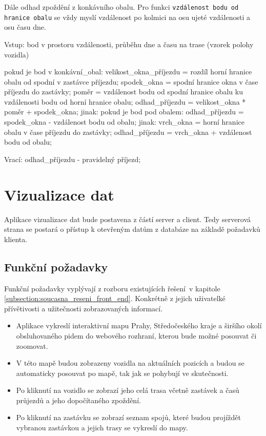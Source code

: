 Dále odhad zpoždění z konkávního obalu. Pro funkci \verb-vzdálenost bodu od hranice obalu- se vždy myslí vzdálenost po kolmici na osu ujeté vzdálenosti a osu času dne.

\begin{code}[frame=none]
Vstup: bod v prostoru vzdálenosti, průběhu dne
  a času na trase (vzorek polohy vozidla)

pokud je bod v konkávní_obal:
  velikost_okna_příjezdu = rozdíl horní hranice obalu od spodní
    v zastávce příjezdu;
  spodek_okna = spodní hranice okna v čase
    příjezdu do zastávky;
  poměr = vzdálenost bodu od spodní hranice obalu
	ku vzdálenosti bodu od horní hranice obalu;
  odhad_příjezdu = velikost_okna * poměr + spodek_okna;
jinak:
  pokud je bod pod obalem:
    odhad_příjezdu = spodek_okna - vzdálenost bodu od obalu;
  jinak:
    vrch_okna = horní hranice obalu
	  v čase příjezdu do zastávky;
    odhad_příjezdu = vrch_okna + vzdálenost bodu od obalu;

Vrací: odhad_příjezdu - pravidelný příjezd;
\end{code}


\section{Vizualizace dat}

 Aplikace vizualizace dat bude postavena z částí server a client. Tedy serverová strana se postará o přístup k otevřeným datům z databáze na základě požadavků klienta.

\subsection{Funkční požadavky}

Funkční požadavky vyplývají z rozboru existujících řešení v kapitole \ref{subsection:soucasna_reseni_front_end}. Konkrétně z jejich uživatelké přívětivosti a užitečnosti zobrazovaných informací.

\begin{itemize}

	\item Aplikace vykreslí interaktivní mapu Prahy, Středočeského kraje a širšího okolí obsluhovaného \gls{pid}em do webového rozhraní, kterou bude možné posouvat či zoomovat.

	\item V této mapě budou zobrazeny vozidla na aktuálních pozicích a budou se automaticky posouvat po mapě, tak jak se pohybují ve skutečnosti.

	\item Po kliknutí na vozidlo se zobrazí jeho celá trasa včetně zastávek a časů průjezdů a jeho dopočítaného zpoždění.

	\item Po kliknutí na zastávku se zobrazí seznam spojů, které budou projíždět vybranou zastávkou a jejich trasy se vykreslí do mapy.

\end{itemize}

